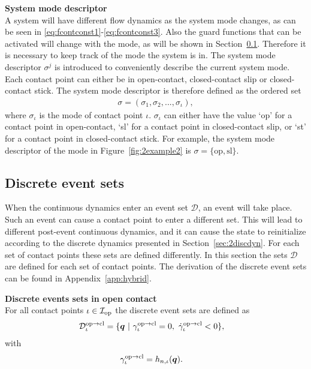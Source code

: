 \documentclass[../DC2017114Bouma.tex]{subfiles}
\begin{document}
\textbf{System mode descriptor}\\
A system will have different flow dynamics as the system mode changes, as can be seen in \eqref{eq:fcontconst1}-\eqref{eq:fcontconst3}. Also the guard functions that can be activated will change with the mode, as will be shown in Section~\ref{sec:2event}. Therefore it is necessary to keep track of the mode the system is in. The system mode descriptor $\sigma^j$ is introduced to conveniently describe the current system mode. Each contact point can either be in open-contact, closed-contact slip or closed-contact stick. The system mode descriptor is therefore defined as the ordered set
\begin{align}
\sigma = (\sigma_1,\sigma_2,...,\sigma_\iota),
\end{align}
where $\sigma_\iota$ is the mode of contact point $\iota$. $\sigma_\iota$ can either have the value `op' for a contact point in open-contact, `sl' for a contact point in closed-contact slip, or `st' for a contact point in closed-contact stick. For example, the system mode descriptor of the mode in Figure~\ref{fig:2example2} is $\sigma = \{\text{op},\text{sl}\}$.

\subsection{Discrete event sets}\label{sec:2event}
When the continuous dynamics enter an event set $\mathcal{D}$, an event will take place. Such an event can cause a contact point to enter a different set. This will lead to different post-event continuous dynamics, and it can cause the state to reinitialize according to the discrete dynamics presented in Section~\ref{sec:2discdyn}. For each set of contact points these sets are defined differently. In this section the sets $\mathcal{D}$ are defined for each set of contact points. The derivation of the discrete event sets can be found in Appendix~\ref{app:hybrid}.

\textbf{Discrete events sets in open contact}\\
For all contact points $\iota\in\mathcal{I}_{\text{op}}$ the discrete event sets are defined as
\begin{align}
\mathcal{D}^{\text{op}\rightarrow\text{cl}}_{\iota} &= \{ \qb\ |\ \gamma^{\text{op}\rightarrow\text{cl}}_{\iota} = 0,\ \dot{\gamma}^{\text{op}\rightarrow\text{cl}}_{\iota} < 0 \},\label{eq:2Dopcl}
\end{align}
%
with
\begin{align}
\gamma^{\text{op}\rightarrow\text{cl}}_{\iota} &= h_{n,\iota}({\boldsymbol{q}}).
\end{align}
\end{document}
